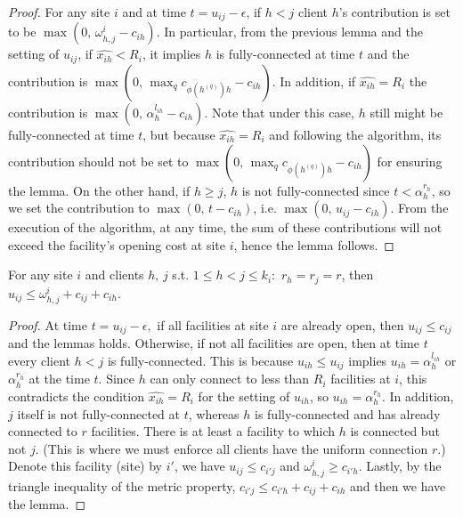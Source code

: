 \documentclass[10pt]{llncs}
\begin{document}
\begin{proof}
For any site $i$ and at time $t=u_{ij}-\epsilon$, if $h<j$ client
$h$'s contribution is set to be $\max\left(0,\,\omega_{h,j}^{i}-c_{ih}\right)$.
In particular, from the previous lemma and the setting of $u_{ij}$,
if $\hat{x_{ih}}<R_{i}$, it implies $h$ is fully-connected at time
$t$ and the contribution is $\max\left(0,\,\max_{q}c_{\phi\left(h^{\left(q\right)}\right)h}-c_{ih}\right)$.
In addition, if $\hat{x_{ih}}=R_{i}$ the contribution is $\max\left(0,\,\alpha_{h}^{l_{ih}}-c_{ih}\right)$.
Note that under this case, $h$ still might be fully-connected at
time $t$, but because $\hat{x_{ih}}=R_{i}$ and following the algorithm,
its contribution should not be set to $\max\left(0,\,\max_{q}c_{\phi\left(h^{\left(q\right)}\right)h}-c_{ih}\right)$
for ensuring the lemma. On the other hand, if $h\geq j$, $h$ is
not fully-connected since $t<\alpha_{h}^{r_{h}}$, so we set the contribution
to $\max\left(0,\, t-c_{ih}\right)$, i.e. $\max\left(0,\, u_{ij}-c_{ih}\right)$.
From the execution of the algorithm, at any time, the sum of these
contributions will not exceed the facility's opening cost at site
$i$, hence the lemma follows.\end{proof}
\begin{lemma}
For any site $i$ and clients $h,\, j$ s.t. $1\leq h<j\leq k_{i}:$
$r_{h}=r_{j}=r$, then ${\displaystyle u_{ij}\leq\omega_{h,j}^{i}+c_{ij}}+c_{ih}$.\label{lem:tri}\end{lemma}
\begin{proof}
At time $t=u_{ij}-\epsilon,$ if all facilities at site $i$ are already
open, then $u_{ij}\leq c_{ij}$ and the lemmas holds. Otherwise, if
not all facilities are open, then at time $t$ every client $h<j$
is fully-connected. This is because $u_{ih}\leq u_{ij}$ implies $u_{ih}=\alpha_{h}^{l_{ih}}$
or $\alpha_{h}^{r_{h}}$ at the time $t$. Since $h$ can only connect
to less than $R_{i}$ facilities at $i$, this contradicts the condition
$\hat{x_{ih}}=R_{i}$ for the setting of $u_{ih}$, so $u_{ih}=\alpha_{h}^{r_{h}}.$
In addition, $j$ itself is not fully-connected at $t$, whereas $h$
is fully-connected and has already connected to $r$ facilities. There
is at least a facility to which $h$ is connected but not $j$. (This
is where we must enforce all clients have the uniform connection $r$.)
Denote this facility (site) by $i'$, we have $u_{ij}\leq c_{i'j}$
and $\omega_{h,j}^{i}\geq c_{i'h}$. Lastly, by the triangle inequality
of the metric property, $c_{i'j}\leq c_{i'h}+c_{ij}+c_{ih}$ and then
we have the lemma.
\end{proof}
\end{document}
